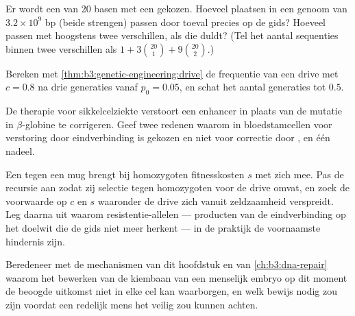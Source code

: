 \begin{exercise}[$\star\star$]\label{exo:b3:genetic-engineering:8}
Er wordt een  van 20 basen met een  gekozen. Hoeveel
plaatsen in een genoom van $3.2\times 10^{9}$ bp (beide strengen) passen
door toeval precies op de gids? Hoeveel passen met hoogstens twee
verschillen, als  die duldt? (Tel het aantal sequenties binnen twee
verschillen als $1 + 3\binom{20}{1} +
9\binom{20}{2}$.)
\end{exercise}

\begin{exercise}[$\star\star$]\label{exo:b3:genetic-engineering:9}
Bereken met \cref{thm:b3:genetic-engineering:drive} de frequentie van
een drive met $c = 0.8$ na drie generaties vanaf $p_{0} = 0.05$, en
schat het aantal generaties tot $0.5$.
\end{exercise}

\begin{exercise}[$\star\star\star$]\label{exo:b3:genetic-engineering:10}
De therapie voor sikkelcelziekte verstoort een enhancer in plaats van
de mutatie in $\beta$-globine te corrigeren. Geef twee redenen waarom
in bloedstamcellen voor verstoring door eindverbinding is gekozen en
niet voor correctie door , en één nadeel.
\end{exercise}

\begin{exercise}[$\star\star\star$]\label{exo:b3:genetic-engineering:11}
Een  tegen een mug brengt bij homozygoten fitnesskosten $s$ met
zich mee. Pas de recursie aan zodat zij selectie tegen homozygoten voor
de drive omvat, en zoek de voorwaarde op $c$ en $s$ waaronder de drive
zich vanuit zeldzaamheid verspreidt. Leg daarna uit waarom
resistentie-allelen --- producten van de eindverbinding op het doelwit
die de gids niet meer herkent --- in de praktijk de voornaamste
hindernis zijn.
\end{exercise}

\begin{exercise}[$\star\star\star$]\label{exo:b3:genetic-engineering:12}
Beredeneer met de mechanismen van dit hoofdstuk en van
\cref{ch:b3:dna-repair} waarom het bewerken van de kiembaan van een
menselijk embryo op dit moment de beoogde uitkomst niet in elke cel kan
waarborgen, en welk bewijs nodig zou zijn voordat een redelijk mens het
veilig zou kunnen achten.
\end{exercise}

